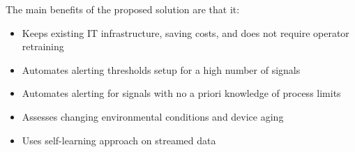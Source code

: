 The main benefits of the proposed solution are that it:
\begin{itemize}
\item Keeps existing IT infrastructure, saving costs, and does not require operator retraining
\item Automates alerting thresholds setup for a high number of signals
\item Automates alerting for signals with no a priori knowledge of process limits
\item Assesses changing environmental conditions and device aging
\item Uses self-learning approach on streamed data
\end{itemize}

